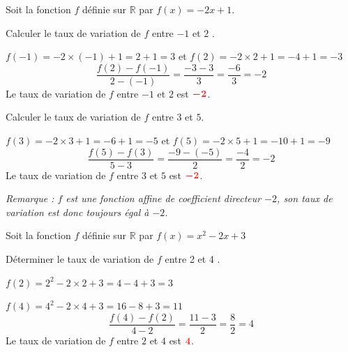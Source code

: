 \documentclass[11pt,a4paper]{article}  %
\begin{document}
	Soit la fonction $f$ définie sur $\mathbb{R}$ par $f(x)=-2 x+1$.
	\begin{enumMet}
		\item Calculer le taux de variation de $f$ entre $-1$ et $2$ .
		
		\begin{corrBox}
			$f(-1)=-2\times(-1)+1=2+1=3$ \quad {} \quad et \quad $f(2)=-2\times 2+1=-4+1=-3$ \quad {}
			\[\dfrac{f(2)-f(-1)}{2-(-1)}=\dfrac{-3-3}{3}=\dfrac{-6}{3}=-2\]
			Le taux de variation de $f$ entre $-1$ et $2$ est $\mRouge{-2}$. \quad {}
		\end{corrBox}
		
		\item {} Calculer le taux de variation de $f$ entre $3$ et $5$.
		
		\begin{corrBox}
			$f(3)=-2\times 3+1=-6+1=-5$ \quad {} \quad et \quad $f(5)=-2\times 5+1=-10+1=-9$ \quad \bareme{0,5}
			\[\dfrac{f(5)-f(3)}{5-3}=\dfrac{-9-(-5)}{2}=\dfrac{-4}{2}=-2\]
			Le taux de variation de $f$ entre $3$ et $5$ est $\mRouge{-2}$. \quad \bareme{1}
			
			\emph{Remarque : $f$ est une fonction affine de coefficient directeur $-2$, son taux de variation est donc toujours égal à $-2$.}
		\end{corrBox}
	\end{enumMet}
	
	\exerciceDS { $-$ (3 points)}
	
	Soit la fonction $f$ définie sur $\mathbb{R}$ par $f(x)=x^2-2x+3$
	
	Déterminer le taux de variation de $f$ entre 2 et 4 .
	
	\begin{corrBox}
		$f(2)=2^2-2\times 2+3=4-4+3=3$ \quad {}
		
		$f(4)=4^2-2\times 4+3=16-8+3=11$ \quad \bareme{1}
		\[\dfrac{f(4)-f(2)}{4-2}=\dfrac{11-3}{2}=\dfrac{8}{2}=4\]
		Le taux de variation de $f$ entre $2$ et $4$ est $\mRouge{4}$. \quad \bareme{1}
	\end{corrBox}
	
	\newpage
	
	
\end{document}
